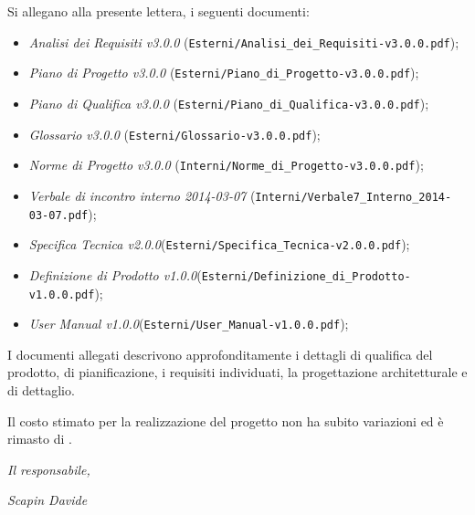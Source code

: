 \documentclass[10pt,a4paper,sans]{moderncv}        %
\begin{document}
Si allegano alla presente lettera, i seguenti documenti:
\begin{itemize}
	\item \textit{Analisi dei Requisiti v3.0.0} ({\verb!Esterni/Analisi_dei_Requisiti-v3.0.0.pdf!});
	\item \textit{Piano di Progetto v3.0.0} ({\verb!Esterni/Piano_di_Progetto-v3.0.0.pdf!});
	\item \textit{Piano di Qualifica v3.0.0} ({\verb!Esterni/Piano_di_Qualifica-v3.0.0.pdf!});
	\item \textit{Glossario v3.0.0} ({\verb!Esterni/Glossario-v3.0.0.pdf!});
	\item \textit{Norme di Progetto v3.0.0} ({\verb!Interni/Norme_di_Progetto-v3.0.0.pdf!});
	\item \textit{Verbale di incontro interno 2014-03-07} ({\verb!Interni/Verbale7_Interno_2014-03-07.pdf!});
	\item \textit{Specifica Tecnica v2.0.0}({\verb!Esterni/Specifica_Tecnica-v2.0.0.pdf!});
	\item \textit{Definizione di Prodotto v1.0.0}({\verb!Esterni/Definizione_di_Prodotto-v1.0.0.pdf!});
	\item \textit{User Manual v1.0.0}({\verb!Esterni/User_Manual-v1.0.0.pdf!});
	
\end{itemize}

I documenti allegati descrivono approfonditamente i dettagli di qualifica del prodotto, di pianificazione, i requisiti individuati, la progettazione architetturale e di dettaglio.

Il costo stimato per la realizzazione del progetto non ha subito variazioni ed è rimasto di \textbf{}.
\begin{flushright}
\textit{Il responsabile,} 

\textit{Scapin Davide}
\end{flushright}
\end{document}

